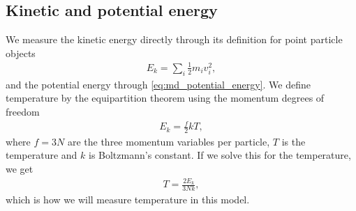 \subsection{Kinetic and potential energy}
We measure the kinetic energy directly through its definition for point particle objects
\begin{align}
	E_k = \sum_i \frac{1}{2} m_iv_i^2,
\end{align}
and the potential energy through \eqref{eq:md_potential_energy}. We define temperature by the equipartition theorem using the momentum degrees of freedom
\begin{align*}
	E_k = \frac{f}{2}kT,
\end{align*}
where $f=3N$ are the three momentum variables per particle, $T$ is the temperature and $k$ is Boltzmann's constant. If we solve this for the temperature, we get 
\begin{align}
	T = \frac{2E_k}{3Nk},
\end{align}
which is how we will measure temperature in this model. 
